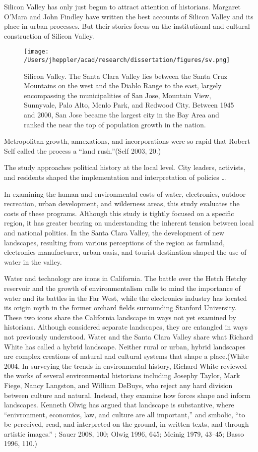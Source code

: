 \documentclass[11pt,article,oneside]{memoir}
\makeatletter
\def\maxwidth{\ifdim\Gin@nat@width>\linewidth\linewidth
\else\Gin@nat@width\fi}
\let\Oldincludegraphics\includegraphics
\renewcommand{\includegraphics}[1]{\Oldincludegraphics[width=\maxwidth]{#1}}
\makeatother
\begin{document}
Silicon Valley has only just begun to attract attention of historians.
Margaret O'Mara and John Findley have written the best accounts of
Silicon Valley and its place in urban processes. But their stories focus
on the institutional and cultural construction of Silicon Valley.

\begin{figure}[htbp]
\centering
\texttt{[image: /Users/jheppler/acad/research/dissertation/figures/sv.png]}
\caption{Silicon Valley. The Santa Clara Valley lies between the Santa
Cruz Mountains on the west and the Diablo Range to the east, largely
encompassing the municipalities of San Jose, Mountain View, Sunnyvale,
Palo Alto, Menlo Park, and Redwood City. Between 1945 and 2000, San Jose
became the largest city in the Bay Area and ranked the near the top of
population growth in the nation.}
\end{figure}

Metropolitan growth, annexations, and incorporations were so rapid that
Robert Self called the process a ``land rush.''(Self 2003, 20.)

The study approaches political history at the local level. City leaders,
activists, and residents shaped the implementation and interpretation of
policies \ldots{}

In examining the human and environmental costs of water, electronics,
outdoor recreation, urban development, and wilderness areas, this study
evaluates the costs of these programs. Although this study is tightly
focused on a specific region, it has greater bearing on understanding
the inherent tension between local and national politics. In the Santa
Clara Valley, the development of new landscapes, resulting from various
perceptions of the region as farmland, electronics manufacturer, urban
oasis, and tourist destination shaped the use of water in the valley.

Water and technology are icons in California. The battle over the Hetch
Hetchy reservoir and the growth of environmentalism calls to mind the
importance of water and its battles in the Far West, while the
electronics industry has located its origin myth in the former orchard
fields surrounding Stanford University. These two icons share the
California landscape in ways not yet examined by historians. Although
considered separate landscapes, they are entangled in ways not
previously understood. Water and the Santa Clara Valley share what
Richard White has called a hybrid landscape. Neither rural or urban,
hybrid landscapes are complex creations of natural and cultural systems
that shape a place.(White 2004. In surveying the trends in environmental
history, Richard White reviewed the works of several environmental
historians including Josephy Taylor, Mark Fiege, Nancy Langston, and
William DeBuys, who reject any hard division between culture and
natural. Instead, they examine how forces shape and inform landscapes.
Kenneth Olwig has argued that landscape is substantive, where
``enivronment, economics, law, and culture are all important,'' and
smbolic, ``to be perceived, read, and interpreted on the ground, in
written texts, and through artistic images.'' ; Sauer 2008, 100; Olwig
1996, 645; Meinig 1979, 43--45; Basso 1996, 110.)
\end{document}

